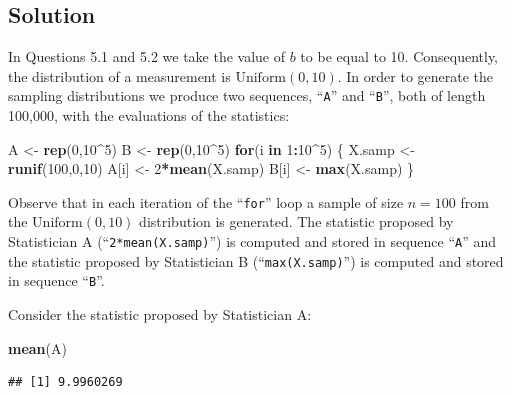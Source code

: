 \documentclass[]{krantz}
\makeatletter
\newenvironment{Shaded}{\begin{snugshade}}{\end{snugshade}}
\newcommand{\KeywordTok}[1]{\textcolor[rgb]{0.13,0.29,0.53}{\textbf{#1}}}
\newcommand{\DecValTok}[1]{\textcolor[rgb]{0.00,0.00,0.81}{#1}}
\newcommand{\StringTok}[1]{\textcolor[rgb]{0.31,0.60,0.02}{#1}}
\newcommand{\ControlFlowTok}[1]{\textcolor[rgb]{0.13,0.29,0.53}{\textbf{#1}}}
\newcommand{\OperatorTok}[1]{\textcolor[rgb]{0.81,0.36,0.00}{\textbf{#1}}}
\newcommand{\NormalTok}[1]{#1}
\newenvironment{kframe}{%
\medskip{}
\setlength{\fboxsep}{.8em}
 \def\at@end@of@kframe{}%
 \ifinner\ifhmode%
  \def\at@end@of@kframe{\end{minipage}}%
  \begin{minipage}{\columnwidth}%
 \fi\fi%
 \def\FrameCommand##1{\hskip\@totalleftmargin \hskip-\fboxsep
 \colorbox{shadecolor}{##1}\hskip-\fboxsep
     \hskip-\linewidth \hskip-\@totalleftmargin \hskip\columnwidth}%
 \MakeFramed {\advance\hsize-\width
   \@totalleftmargin\z@ \linewidth\hsize
   \@setminipage}}%
 {\par\unskip\endMakeFramed%
 \at@end@of@kframe}
\renewenvironment{Shaded}{\begin{kframe}}{\end{kframe}}
\theoremstyle{definition}
\theoremstyle{definition}
\theoremstyle{definition}
\theoremstyle{remark}
\makeatother
\begin{document}
\subsection*{Solution}\label{solution-4}


In Questions 5.1 and 5.2 we take the value of \(b\) to be equal to 10.
Consequently, the distribution of a measurement is
\(\mbox{Uniform}(0,10)\). In order to generate the sampling
distributions we produce two sequences, ``\texttt{A}'' and
``\texttt{B}'', both of length 100,000, with the evaluations of the
statistics:

\begin{Shaded}
\begin{Highlighting}[]
\NormalTok{A <-}\StringTok{ }\KeywordTok{rep}\NormalTok{(}\DecValTok{0}\NormalTok{,}\DecValTok{10}\OperatorTok{^}\DecValTok{5}\NormalTok{)}
\NormalTok{B <-}\StringTok{ }\KeywordTok{rep}\NormalTok{(}\DecValTok{0}\NormalTok{,}\DecValTok{10}\OperatorTok{^}\DecValTok{5}\NormalTok{)}
\ControlFlowTok{for}\NormalTok{(i }\ControlFlowTok{in} \DecValTok{1}\OperatorTok{:}\DecValTok{10}\OperatorTok{^}\DecValTok{5}\NormalTok{) \{}
\NormalTok{  X.samp <-}\StringTok{ }\KeywordTok{runif}\NormalTok{(}\DecValTok{100}\NormalTok{,}\DecValTok{0}\NormalTok{,}\DecValTok{10}\NormalTok{)}
\NormalTok{  A[i] <-}\StringTok{ }\DecValTok{2}\OperatorTok{*}\KeywordTok{mean}\NormalTok{(X.samp)}
\NormalTok{  B[i] <-}\StringTok{ }\KeywordTok{max}\NormalTok{(X.samp)}
\NormalTok{\}}
\end{Highlighting}
\end{Shaded}

Observe that in each iteration of the ``\texttt{for}'' loop a sample of
size \(n=100\) from the \(\mbox{Uniform}(0,10)\) distribution is
generated. The statistic proposed by Statistician A
(``\texttt{2*mean(X.samp)}'') is computed and stored in sequence
``\texttt{A}'' and the statistic proposed by Statistician B
(``\texttt{max(X.samp)}'') is computed and stored in sequence
``\texttt{B}''.

Consider the statistic proposed by Statistician A:

\begin{Shaded}
\begin{Highlighting}[]
\KeywordTok{mean}\NormalTok{(A)}
\end{Highlighting}
\end{Shaded}

\begin{verbatim}
## [1] 9.9960269
\end{verbatim}
\end{document}
